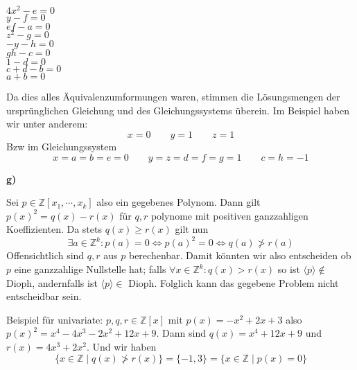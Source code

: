 \documentclass[a4paper,graphics,11pt]{article}
\newcommand{\godel}[1]{\langle #1 \rangle}
\begin{document}
\begin{minipage}{.3\textwidth}
$4x^2 - e = 0$\\
$y-f = 0$\\
$ef -a = 0$\\
$z^2 - g = 0$\\
$-y -h = 0$\\
$gh - c = 0$\\
$1 - d = 0$\\
$c+d - b = 0$\\
$a+b = 0$
\end{minipage}
\begin{minipage}{.7\textwidth}
    Da dies alles Äquivalenzumformungen waren, stimmen die Lösungsmengen
    der ursprünglichen Gleichung und des Gleichungssystems überein.
    Im Beispiel haben wir unter anderem:
    $$
        x = 0\qquad
        y= 1\qquad
        z = 1
    $$
    Bzw im Gleichungssystem
    $$
        x = a = b = e = 0 \qquad
        y = z = d = f = g = 1\qquad
        c = h = -1
    $$
\end{minipage}

\textbf{g)}

Sei $p \in \mathbb{Z}[x_1,\cdots,x_k]$ also ein gegebenes Polynom. Dann gilt $p(x)^2 = q(x) - r(x)$
für $q,r$ polynome mit positiven ganzzahligen Koeffizienten. Da stets $q(x) \geq r(x)$ gilt nun
$$
    \exists a \in \mathbb{Z}^k: p(a) = 0
    \iff
    p(a)^2 = 0
    \iff
    q(a) \not> r(a)
$$
Offensichtlich sind $q,r$ aus $p$ berechenbar. Damit könnten wir also entscheiden ob $p$ eine ganzzahlige
Nullstelle hat; falls $\forall x \in \mathbb{Z}^k : q(x) > r(x)$ so ist $\godel{p} \notin$ Dioph,
andernfalls ist $\godel{p} \in$ Dioph. Folglich kann das gegebene Problem nicht entscheidbar sein.

Beispiel für univariate: $p,q,r \in \mathbb{Z}[x]$ mit $p(x) = -x^2+2x+3$ also $p(x)^2 = x^4-4x^3-2x^2+12x+9$.
Dann sind $q(x) = x^4+12x+9$ und $r(x) = 4x^3+2x^2$. Und wir haben
$$
    \{x \in \mathbb{Z} \mid q(x) \not> r(x)\} = \{-1,3\} = \{x \in \mathbb{Z} \mid p(x) = 0\}
$$
\end{document}
